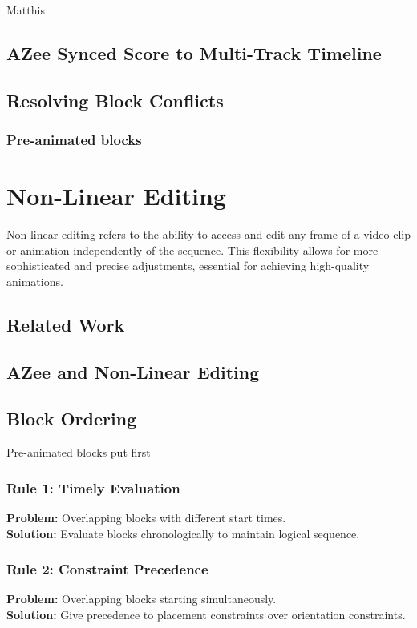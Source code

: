 \documentclass[../../main.tex]{subfiles}
\begin{document}
Matthis

\subsection{AZee Synced Score to Multi-Track Timeline}

\subsection{Resolving Block Conflicts}


\subsubsection{Pre-animated blocks}

\section{Non-Linear Editing}

Non-linear editing refers to the ability to access and edit any frame of a video clip or animation independently of the sequence. This flexibility allows for more sophisticated and precise adjustments, essential for achieving high-quality animations.

\subsection{Related Work}

\subsection{AZee and Non-Linear Editing}

\subsection{Block Ordering}

Pre-animated blocks put first

\subsubsection{Rule 1: Timely Evaluation}
\textbf{Problem:} Overlapping blocks with different start times.\\
\textbf{Solution:} Evaluate blocks chronologically to maintain logical sequence.

\subsubsection{Rule 2: Constraint Precedence}
\textbf{Problem:} Overlapping blocks starting simultaneously.\\
\textbf{Solution:} Give precedence to placement constraints over orientation constraints.
\end{document}
